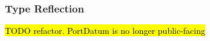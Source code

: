 


\subsubsection{Type Reflection}
\label{sec:type_reflection}
\hl{TODO refactor. PortDatum is no longer public-facing}



